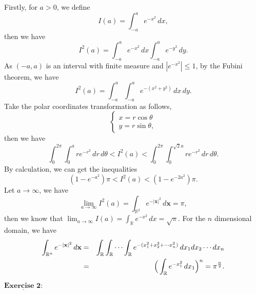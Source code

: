 \documentclass[12pt,a4paper]{ctexart}
\begin{document}
Firstly, for $a > 0$, we define 
\begin{equation*}
    I(a) = \int_{-a}^{a} e^{- x^{2}} \, d x,
\end{equation*}
then we have
\begin{equation*}
    I^{2}(a) = \int_{-a}^{a} e^{- x^{2}} \, d x \int_{-a}^{a} e^{- y^{2}} \, d y.
\end{equation*}
As $(-a, a)$ is an interval with finite measure and $|e^{-x^{2}}| \leq 1$, by the Fubini theorem, we have
\begin{equation*}
    I^{2}(a) = \int_{-a}^{a} \int_{-a}^{a} e^{- (x^{2}+y^{2})} \, d x \, d y.
\end{equation*}
Take the polar coordinates transformation as follows,
\begin{equation*}
\left\{
             \begin{array}{cl}
             x = r \cos \theta \\
             y = r \sin \theta, 
             \end{array}
\right.
\end{equation*}
then we have
\begin{equation*}
    \int_{0}^{2 \pi} \int_{0}^{a} r e^{-r^{2}} \, d r\, d \theta < I^{2}(a) < \int_{0}^{2 \pi} \int_{0}^{\sqrt{2} a} r e^{-r^{2}}  \, d r \, d \theta.
\end{equation*}
By calculation, we can get the inequalities
\begin{equation*}
    (1 - e^{- a^{2}}) \pi < I^{2}(a) < (1 - e^{- 2a^{2}}) \pi .
\end{equation*}
Let $a \to \infty$, we have \begin{equation*}
    \lim_{a \to \infty} I^{2}(a) = \int_{\mathbb{R}^{2}}^{} e^{- |\textbf{x}|^{2}} \, d \textbf{x} = \pi,
\end{equation*}
then we know that $\lim_{a \to \infty} I(a) = \int_{\mathbb{R}}^{} e^{- x^{2}} \, d x = \sqrt{\pi}$. For the $n$ dimensional domain, we have
\begin{eqnarray*}
    \int_{\mathbb{R}^{n}}^{} e^{- |\textbf{x}|^{2}} \, d \textbf{x} & = & \int_{\mathbb{R}}^{} \int_{\mathbb{R}}^{} \cdots \int_{\mathbb{R}}^{} e^{- (x_{1}^{2} + x_{2}^{2} + \cdots x_{n}^{2})} \, d x_{1} d x_{2} \cdots d x_{n} \\
    & = & \Big{(} \int_{\mathbb{R}}^{} e^{- x_{1}^{2} } \, d x_{1} \Big{)}^{n} = \pi^{\frac{n}{2}}.
\end{eqnarray*}

\newpage

$\underline{\textbf{Exercise 2:}}$
\end{document}
